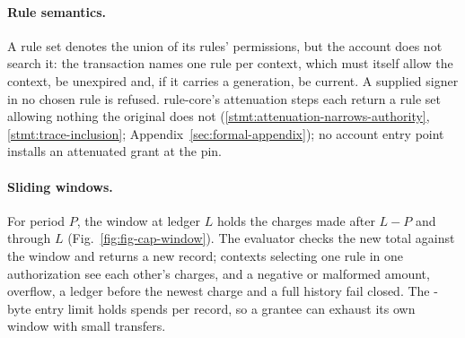 \paragraph{Rule semantics.} A rule set denotes the union of its rules'
permissions, but the account does not search it: the transaction names one rule
per context, which must itself allow the context, be unexpired and, if it
carries a generation, be current. A supplied signer in no chosen rule is
refused. rule-core's  attenuation steps each return a rule
set allowing nothing the original does not (\ref{stmt:attenuation-narrows-authority},
\ref{stmt:trace-inclusion}; Appendix~\ref{sec:formal-appendix}); no account entry
point installs an attenuated grant at the pin.

\paragraph{Sliding windows.} For period $P$, the window at ledger $L$ holds the
charges made after $L-P$ and through $L$ (Fig.~\ref{fig:fig-cap-window}). The
evaluator checks the new total against the window and returns a new record;
contexts selecting one rule in one authorization see each other's charges, and a
negative or malformed amount, overflow, a ledger before the newest charge and a
full history fail closed. The -byte entry limit
holds  spends per record, so a grantee can exhaust its
own window with small transfers.
